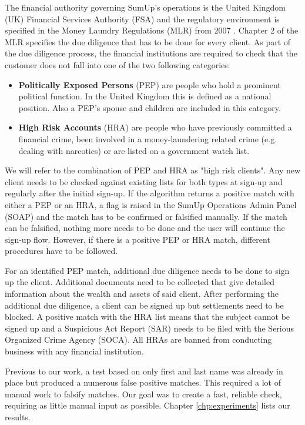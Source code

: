\documentclass[a4paper, oneside]{csthesis}
\begin{document}
The financial authority governing SumUp's operations is the United Kingdom (UK) Financial Services Authority (FSA) and the regulatory environment is specified in the Money Laundry Regulations (MLR) from 2007 \cite{website:aml-regulations-2007}. Chapter 2 of the MLR specifies the due diligence that has to be done for every client. As part of the due diligence process, the financial institutions are required to check that the customer does not fall into one of the two following categories:

\begin{itemize}
\item \textbf{Politically Exposed Persons} (PEP) are people who hold a prominent political function. In the United Kingdom this is defined as a national position. Also a PEP's spouse and children are included in this category.

\item \textbf{High Risk Accounts} (HRA) are people who have previously committed a financial crime, been involved in a money-laundering related crime (e.g. dealing with narcotics) or are listed on a government watch list.

\end{itemize}

We will refer to the combination of PEP and HRA as "high risk clients". Any new client needs to be checked against existing lists for both types at sign-up and regularly after the initial sign-up.
If the algorithm returns a positive match with either a PEP or an HRA, a flag is raised in the SumUp Operations Admin Panel (SOAP) and the match has to be confirmed or falsified manually. If the match can be falsified, nothing more needs to be done and the user will continue the sign-up flow. However, if there is a positive PEP or HRA match, different procedures have to be followed.

For an identified PEP match, additional due diligence needs to be done to sign up the client. Additional documents need to be collected that give detailed information about the wealth and assets of said client. After performing the additional due diligence, a client can be signed up but settlements need to be blocked.
A positive match with the HRA list means that the subject cannot be signed up and a Suspicious Act Report (SAR) needs to be filed with the Serious Organized Crime Agency (SOCA). All HRAs are banned from conducting business with any financial institution.

Previous to our work, a test based on only first and last name was already in place but produced a numerous false positive matches. This required a lot of manual work to falsify matches. Our goal was to create a fast, reliable check, requiring as little manual input as possible. Chapter \ref{chp:experiments} lists our results.
\end{document}

